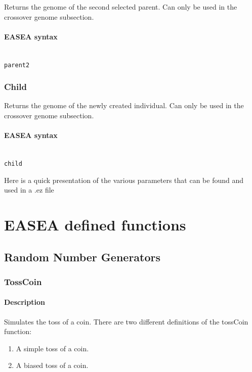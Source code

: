 \documentclass{book}
\begin{document}
Returns the genome of the second selected parent. Can only be used in
the crossover genome
subsection.

\paragraph{EASEA syntax}\label{easea-syntax-13}
~\\

\texttt{parent2}

\subsubsection{Child}\label{child}

Returns the genome of the newly created individual. Can only be used in
the crossover genome
subsection.

\paragraph{EASEA syntax}\label{easea-syntax-14}
~\\

\texttt{child}

Here is a quick presentation of the various parameters that can be found
and used in a .ez file



\section{EASEA defined functions}
\subsection{Random Number Generators}\label{random-number-generators}

\subsubsection{TossCoin}\label{tosscoin}

\paragraph{Description}\label{description}

Simulates the toss of a coin. There are two different definitions of the
tossCoin function:

\begin{enumerate}
\itemsep1pt\parskip0pt
\item
  A simple toss of a coin.
\item
  A biased toss of a coin.
\end{enumerate}
\end{document}
